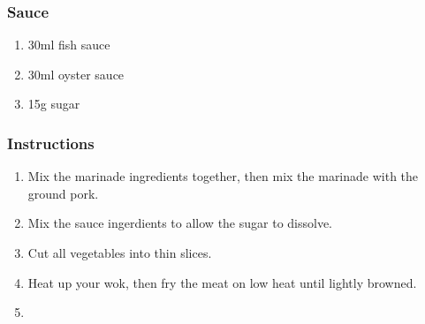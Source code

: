 \documentclass[11pt]{book}
\newcommand{\header}[1]{\subsubsection*{#1}}
\begin{document}
\header{Sauce}
\begin{enumerate}
  \item 30ml fish sauce
  \item 30ml oyster sauce
  \item 15g sugar
\end{enumerate}

\header{Instructions}
\begin{enumerate}
  \item Mix the marinade ingredients together, then mix the marinade with the
  ground pork.
  \item Mix the sauce ingerdients to allow the sugar to dissolve.
  \item Cut all vegetables into thin slices.
  \item Heat up your wok, then fry the meat on low heat until lightly browned.
  \item
\end{enumerate}






\end{document}
